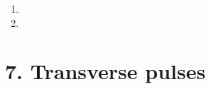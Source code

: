 \begin{enumerate}[label=\textbf{\arabic*}.]
	\item %

	\item %
    \end{enumerate}


\section {7. Transverse pulses}
